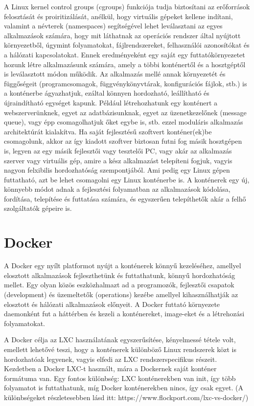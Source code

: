 \documentclass[a4paper]{article}
\begin{document}
A Linux kernel control groups (cgroups) funkciója tudja biztosítani az erőforrások felosztását és proiritizálását,
anélkül, hogy virtuális gépeket kellene indítani, valamint a névterek (namespaces) segítségével lehet leválasztani az
egyes alkalmazások számára, hogy mit láthatnak az operációs rendszer által nyújtott környezetből, úgymint folyamatokat,
fájlrendszereket, felhasználói azonosítókat és a hálózati kapcsolatokat. Ennek eredményeként egy saját egy
futtatókörnyezetet hozunk létre alkalmazásunk számára, amely a többi konténertől és a hosztgéptől is leválasztott módon
működik. Az alkalmazás mellé annak környezetét és függőségeit (programcsomagok, függvénykönyvtárak, konfigurációs
fájlok, stb.) is a konténerbe ágyazhatjuk, ezáltal könnyen hordozható, leállítható és újraindítható egységet kapunk.
Például létrehozhatunk egy konténert a webszerverünknek, egyet az adatbázisunknak, egyet az üzenetkezelőnek (message
queue), vagy épp csomagolhatjuk őket egybe is, stb. ezzel moduláris alkalmazás architektúrát kialakítva. Ha saját
fejlesztésű szoftvert konténer(ek)be csomagolunk, akkor az így kiadott szoftver biztosan futni fog másik hosztgépen is,
legyen az egy másik fejlesztői vagy tesztelői PC, vagy akár az alkalmazás szerver vagy virtuális gép, amire a kész
alkalmazást telepíteni fogjuk, vagyis nagyon felxibilis hordozhatóság szempontjából. Ami pedig egy Linux gépen
futtatható, azt be lehet csomagolni egy Linux konténerbe is. A konténerek egy új, könnyebb módot adnak a fejlesztési
folyamatban az alkalmazások kódolása, fordítása, telepítése és futtatása számára, és egyszerűen telepíthetők akár a
felhő szolgáltatók gépeire is.

\section{Docker}

A Docker egy nyílt platformot nyújt a konténerek könnyű kezeléséhez, amellyel elosztott alkalmazások fejleszthetünk és
futtathatunk, könnyű hordozhatóság mellet. Egy olyan közös eszközhalmazt ad a programozók, fejlesztői csapatok
(development) és üzemeltetők (operations) kezébe amellyel kihasználhatják az elosztott és hálózati alkalmazások
előnyeit. A Docker futtató környezete daemonként fut a háttérben és kezeli a konténereket, image-eket és a létrehozási
folyamatokat.

A Docker célja az LXC használatának egyszerűsítése, kényelmessé tétele volt, emellett lehetővé teszi, hogy a konténerek
különböző Linux rendszerek közt is hordozhatóak legyenek, vagyis elfedi az LXC rendszerspecifikus részeit. Kezdetben a
Docker LXC-t használt, mára a Dockernek saját konténer formátuma van. Egy fontos különbség: LXC konténerekben van init,
így több folyamatot is futtathatunk, míg Docker konténerekben nincs, így csak egyet. (A különbségeket részletesebben
lásd itt: https://www.flockport.com/lxc-vs-docker/)
\end{document}
